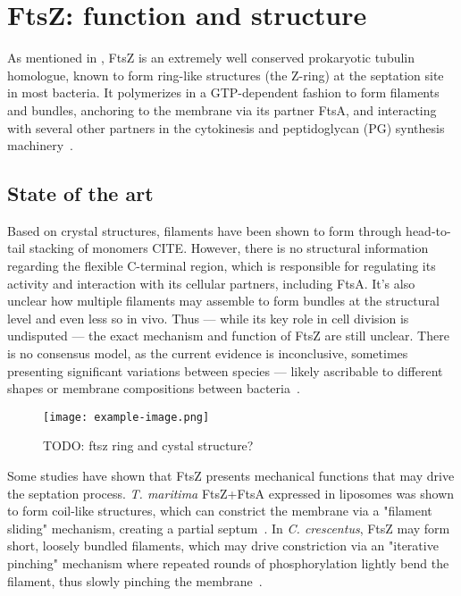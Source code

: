 \chapter{FtsZ: function and structure}\label{ftsz}

As mentioned in , FtsZ is an extremely well conserved prokaryotic tubulin homologue, known to form ring-like structures (the Z-ring) at the septation site in most bacteria.
It polymerizes in a GTP-dependent fashion to form filaments and bundles, anchoring to the membrane via its partner FtsA, and interacting with several other partners in the cytokinesis and peptidoglycan (PG) synthesis machinery~\cite{barrowsFtsZDynamicsBacterial2021,mcquillenInsightsStructureFunction2020}.

\localtableofcontents

\section{State of the art}

Based on crystal structures, filaments have been shown to form through head-to-tail stacking of monomers CITE.
However, there is no structural information regarding the flexible C-terminal region, which is responsible for regulating its activity and interaction with its cellular partners, including FtsA.
It's also unclear how multiple filaments may assemble to form bundles at the structural level and even less so in vivo.
Thus --- while its key role in cell division is undisputed --- the exact mechanism and function of FtsZ are still unclear.
There is no consensus model, as the current evidence is inconclusive, sometimes presenting significant variations between species --- likely ascribable to different shapes or membrane compositions between bacteria~\cite{barrowsFtsZDynamicsBacterial2021,mcquillenInsightsStructureFunction2020}.

\begin{figure}[ht]
    \centering
    \texttt{[image: example-image.png]}
    \caption{TODO: ftsz ring and cystal structure?}
    \label{fig:ftsz_ring}
\end{figure}

Some studies have shown that FtsZ presents mechanical functions that may drive the septation process.
\textit{T. maritima} FtsZ+FtsA expressed in liposomes was shown to form coil-like structures, which can constrict the membrane via a "filament sliding" mechanism, creating a partial septum~\cite{szwedziakArchitectureRingFormed2014}.
In \textit{C. crescentus}, FtsZ may form short, loosely bundled filaments, which may drive constriction via an "iterative pinching" mechanism where repeated rounds of phosphorylation lightly bend the filament, thus slowly pinching the membrane~\cite{liStructureFtsZFilaments2007}.

